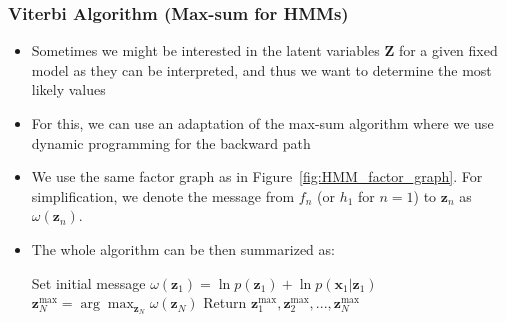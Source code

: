 \subsubsection{Viterbi Algorithm (Max-sum for HMMs)}
\begin{itemize}
	\item Sometimes we might be interested in the latent variables $\bm{Z}$ for a given fixed model as they can be interpreted, and thus we want to determine the most likely values
	\item For this, we can use an adaptation of the max-sum algorithm where we use dynamic programming for the backward path
	\item We use the same factor graph as in Figure~\ref{fig:HMM_factor_graph}. For simplification, we denote the message from $f_n$ (or $h_1$ for $n=1$) to $\bm{z}_n$ as $\omega(\bm{z}_n)$.
	\item The whole algorithm can be then summarized as:
	\begin{tcolorbox}[colback=white!80!gray,colframe=gray!75!black,title=Pseudocode of Viterbi algorithm]
		\begin{algorithm}[H]
			\SetAlgoLined
			\tcp{\textcolor{blue}{Forward pass}}
			Set initial message $\omega(\bm{z}_1) = \ln p(\bm{z}_1) + \ln p(\bm{x}_1|\bm{z}_1)$\;
			\tcp{\textcolor{blue}{Backward pass}}
			$\bm{z}_N^{\text{max}}=\arg\max_{\bm{z}_N} \omega(\bm{z}_N)$\;
			Return $\bm{z}_1^{\text{max}}, \bm{z}_2^{\text{max}},...,\bm{z}_N^{\text{max}}$\;
		\end{algorithm}
	\end{tcolorbox}
\end{itemize}
